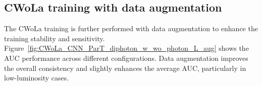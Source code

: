 \documentclass[12pt]{article}
\begin{document}
	\subsection{CWoLa training with data augmentation}%
	\label{sub:cwola_training_with_data_augmentation}
		The CWoLa training is further performed with data augmentation to enhance the training stability and sensitivity. Figure~\ref{fig:CWoLa_CNN_ParT_diphoton_w_wo_photon_L_aug} shows the AUC performance across different configurations. Data augmentation improves the overall consistency and slightly enhances the average AUC, particularly in low-luminosity cases.
        \begin{figure}[htpb]
            \centering
             \\
\end{figure}
\end{document}
